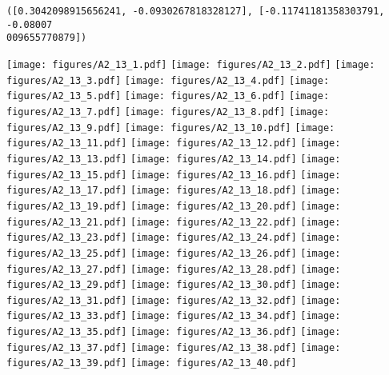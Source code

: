 \documentclass[12pt,a4paper]{article}
\begin{document}
\begin{lstlisting}
([0.3042098915656241, -0.0930267818328127], [-0.11741181358303791, -0.08007
009655770879])
\end{lstlisting}

\texttt{[image: figures/A2\_13\_1.pdf]}
\texttt{[image: figures/A2\_13\_2.pdf]}
\texttt{[image: figures/A2\_13\_3.pdf]}
\texttt{[image: figures/A2\_13\_4.pdf]}
\texttt{[image: figures/A2\_13\_5.pdf]}
\texttt{[image: figures/A2\_13\_6.pdf]}
\texttt{[image: figures/A2\_13\_7.pdf]}
\texttt{[image: figures/A2\_13\_8.pdf]}
\texttt{[image: figures/A2\_13\_9.pdf]}
\texttt{[image: figures/A2\_13\_10.pdf]}
\texttt{[image: figures/A2\_13\_11.pdf]}
\texttt{[image: figures/A2\_13\_12.pdf]}
\texttt{[image: figures/A2\_13\_13.pdf]}
\texttt{[image: figures/A2\_13\_14.pdf]}
\texttt{[image: figures/A2\_13\_15.pdf]}
\texttt{[image: figures/A2\_13\_16.pdf]}
\texttt{[image: figures/A2\_13\_17.pdf]}
\texttt{[image: figures/A2\_13\_18.pdf]}
\texttt{[image: figures/A2\_13\_19.pdf]}
\texttt{[image: figures/A2\_13\_20.pdf]}
\texttt{[image: figures/A2\_13\_21.pdf]}
\texttt{[image: figures/A2\_13\_22.pdf]}
\texttt{[image: figures/A2\_13\_23.pdf]}
\texttt{[image: figures/A2\_13\_24.pdf]}
\texttt{[image: figures/A2\_13\_25.pdf]}
\texttt{[image: figures/A2\_13\_26.pdf]}
\texttt{[image: figures/A2\_13\_27.pdf]}
\texttt{[image: figures/A2\_13\_28.pdf]}
\texttt{[image: figures/A2\_13\_29.pdf]}
\texttt{[image: figures/A2\_13\_30.pdf]}
\texttt{[image: figures/A2\_13\_31.pdf]}
\texttt{[image: figures/A2\_13\_32.pdf]}
\texttt{[image: figures/A2\_13\_33.pdf]}
\texttt{[image: figures/A2\_13\_34.pdf]}
\texttt{[image: figures/A2\_13\_35.pdf]}
\texttt{[image: figures/A2\_13\_36.pdf]}
\texttt{[image: figures/A2\_13\_37.pdf]}
\texttt{[image: figures/A2\_13\_38.pdf]}
\texttt{[image: figures/A2\_13\_39.pdf]}
\texttt{[image: figures/A2\_13\_40.pdf]}
\end{document}
